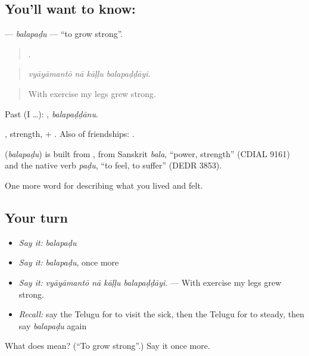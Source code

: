\subsection*{You'll want to know: }
\textbf{} — \emph{balapaḍu} — \textquotedblleft{}to grow strong\textquotedblright{}.

\begin{quote}
   .
\end{quote}

\begin{quote}
\emph{vyāyāmantō nā kāḷḷu balapaḍḍāyi.}
\end{quote}

\begin{quote}
With exercise my legs grew strong.
\end{quote}

Past (I …): , \emph{balapaḍḍānu}.

, strength, + . Also of friendships:  .

\begin{cousinweb}
\textbf{} (\emph{balapaḍu}) is built from , from Sanskrit \emph{bala}, \textquotedblleft{}power, strength\textquotedblright{} (CDIAL 9161) and the native verb \emph{paḍu}, \textquotedblleft{}to feel, to suffer\textquotedblright{} (DEDR 3853).
\end{cousinweb}

\begin{grammarlens}[title={What you've built}]
One more word for describing what you lived and felt.
\end{grammarlens}

\subsection*{Your turn}
\begin{itemize}
\raggedright
  \item \emph{Say it:} \emph{balapaḍu}
  \item \emph{Say it:} \emph{balapaḍu}, once more
  \item \emph{Say it:} \emph{vyāyāmantō nā kāḷḷu balapaḍḍāyi.} — With exercise my legs grew strong.
  \item \emph{Recall:} say the Telugu for to visit the sick, then the Telugu for to steady, then say \emph{balapaḍu} again
\end{itemize}

\begin{tcolorbox}[breakable,colback=teal!4,colframe=teal!35!black,title={Before you move on}]
What does  mean? (\textquotedblleft{}To grow strong\textquotedblright{}.) Say it once more.
\end{tcolorbox}
